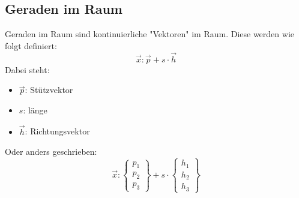 \subsection{Geraden im Raum}
Geraden im Raum sind kontinuierliche "Vektoren" im Raum. 
Diese werden wie folgt definiert: 
\[
\vec{x}: \vec{p} + s\cdot \vec{h} 
\]
Dabei steht:
\begin{itemize}
    \item $\vec{p}$: Stützvektor
    \item $s$: länge
    \item $\vec{h}$: Richtungsvektor
\end{itemize}
Oder anders geschrieben: 
\[
\vec{x}: 
\begin{Bmatrix}
    p_1 \\ p_2 \\ p_3
\end{Bmatrix}
+ s \cdot
\begin{Bmatrix}
    h_1 \\ h_2 \\ h_3
\end{Bmatrix}
\]

